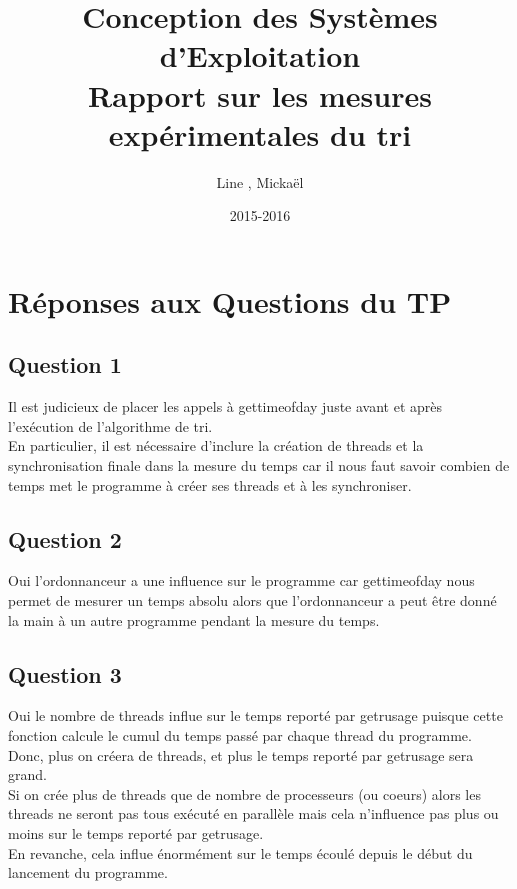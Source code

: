 \documentclass{article}
\title{Conception des Systèmes d'Exploitation\\Rapport sur les mesures expérimentales du tri}
\author{Line \bsc{POUVARET}, Mickaël \bsc{TURNEL}}
\date{2015-2016}
\begin{document}
\maketitle

\section{Réponses aux Questions du TP}

\subsection*{Question 1}

Il est judicieux de placer les appels à gettimeofday juste avant et après l'exécution de l'algorithme de tri.\\

En particulier, il est nécessaire d'inclure la création de threads et la synchronisation finale dans la mesure du temps car il nous faut savoir combien de temps met le programme à créer ses threads et à les synchroniser.

\subsection*{Question 2}

Oui l'ordonnanceur a une influence sur le programme car gettimeofday nous permet de mesurer un temps absolu alors que l'ordonnanceur a peut être donné la main à un autre programme pendant la mesure du temps.

\subsection*{Question 3}

Oui le nombre de threads influe sur le temps reporté par getrusage puisque cette fonction calcule le cumul du temps passé par chaque thread
du programme.\\

Donc, plus on créera de threads, et plus le temps reporté par getrusage sera grand.\\

Si on crée plus de threads que de nombre de processeurs (ou coeurs) alors les threads ne seront pas tous exécuté en parallèle mais cela 
n'influence pas plus ou moins sur le temps reporté par getrusage.\\

En revanche, cela influe énormément sur le temps écoulé depuis le début
du lancement du programme.
\end{document}
